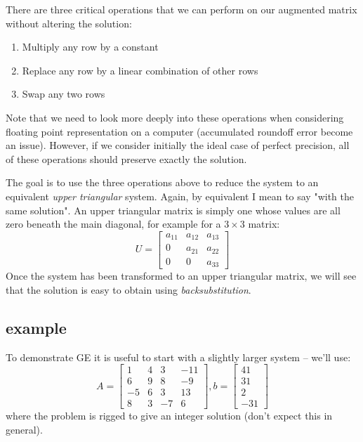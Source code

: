 \documentclass[11pt]{article}
\begin{document}
There are three critical operations that we can perform on our augmented matrix without altering the solution:
\begin{enumerate}
\item Multiply any row by a constant
\item Replace any row by a linear combination of other rows
\item Swap any two rows
\end{enumerate}
Note that we need to look more deeply into these operations when considering floating point representation on a computer (accumulated roundoff error become an issue).
However, if we consider initially the ideal case of perfect precision, all of these operations should preserve exactly the solution.

The goal is to use the three operations above to reduce the system to an equivalent {\it upper triangular} system. Again, by equivalent I mean to say "with the same solution".
An upper triangular matrix is simply one whose values are all zero beneath the main diagonal, for example for a $3\times3$ matrix:
\[
U= \begin{bmatrix} 
a_{11} & a_{12}  & a_{13} \\
0 & a_{21} & a_{22}\\
0 & 0 & a_{33}
\end{bmatrix}
\]
Once the system has been transformed to an upper triangular matrix, we will see that the solution is easy to obtain using {\it backsubstitution}.

\subsection{example}
To demonstrate GE it is useful to start with a slightly larger system -- we'll use:
\[
A = 
\begin{bmatrix}
1 & 4 & 3 & -11 \\
6 & 9 & 8 & -9 \\
-5 & 6 & 3 & 13 \\
8 & 3 & -7 & 6 
\end{bmatrix},
b = 
\begin{bmatrix}
41 \\ 31 \\ 2 \\ -31
\end{bmatrix}
\]
where the problem is rigged to give an integer solution (don't expect this in general).
\end{document}
